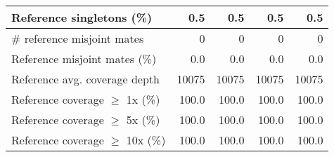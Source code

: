 \documentclass[12pt,a4paper]{article}
\begin{document}
\begin{table}[ht]
\begin{center}
\begin{tabular}{|l*{4}{|r}|}
Reference singletons (\%) & 0.5 & 0.5 & 0.5 & 0.5 \\ \hline
\# reference misjoint mates & 0 & 0 & 0 & 0 \\ \hline
Reference misjoint mates (\%) & 0.0 & 0.0 & 0.0 & 0.0 \\ \hline
Reference avg. coverage depth & 10075 & 10075 & 10075 & 10075 \\ \hline
Reference coverage $\geq$ 1x (\%) & 100.0 & 100.0 & 100.0 & 100.0 \\ \hline
Reference coverage $\geq$ 5x (\%) & 100.0 & 100.0 & 100.0 & 100.0 \\ \hline
Reference coverage $\geq$ 10x (\%) & 100.0 & 100.0 & 100.0 & 100.0 \\ \hline
\end{tabular}
\end{center}
\end{table}
\end{document}
